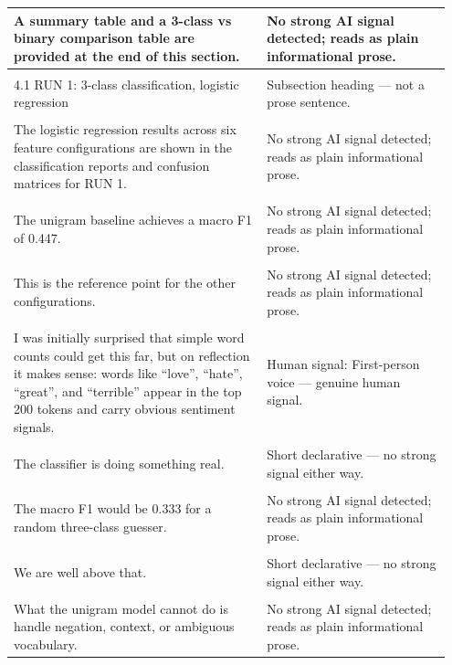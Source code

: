 \documentclass[11pt]{article}
\begin{document}
\begin{longtable}{|p{0.55\linewidth}|p{0.40\linewidth}|}
\hline
A summary table and a 3-class vs binary comparison table are provided at the end of this section. & No strong AI signal detected; reads as plain informational prose. \\[2pt]
\hline
\rule{0pt}{3.5cm} & \\
\hline
4.1 RUN 1: 3-class classification, logistic regression & Subsection heading --- not a prose sentence. \\[2pt]
\hline
\rule{0pt}{3.5cm} & \\
\hline
The logistic regression results across six feature configurations are shown in the classification reports and confusion matrices for RUN 1. & No strong AI signal detected; reads as plain informational prose. \\[2pt]
\hline
\rule{0pt}{3.5cm} & \\
\hline
The unigram baseline achieves a macro F1 of 0.447. & No strong AI signal detected; reads as plain informational prose. \\[2pt]
\hline
\rule{0pt}{3.5cm} & \\
\hline
This is the reference point for the other configurations. & No strong AI signal detected; reads as plain informational prose. \\[2pt]
\hline
\rule{0pt}{3.5cm} & \\
\hline
I was initially surprised that simple word counts could get this far, but on reflection it makes sense: words like ``love'', ``hate'', ``great'', and ``terrible'' appear in the top 200 tokens and carry obvious sentiment signals. & Human signal: First-person voice --- genuine human signal. \\[2pt]
\hline
\rule{0pt}{3.5cm} & \\
\hline
The classifier is doing something real. & Short declarative --- no strong signal either way. \\[2pt]
\hline
\rule{0pt}{3.5cm} & \\
\hline
The macro F1 would be 0.333 for a random three-class guesser. & No strong AI signal detected; reads as plain informational prose. \\[2pt]
\hline
\rule{0pt}{3.5cm} & \\
\hline
We are well above that. & Short declarative --- no strong signal either way. \\[2pt]
\hline
\rule{0pt}{3.5cm} & \\
\hline
What the unigram model cannot do is handle negation, context, or ambiguous vocabulary. & No strong AI signal detected; reads as plain informational prose. \\[2pt]

\end{longtable}
\end{document}
